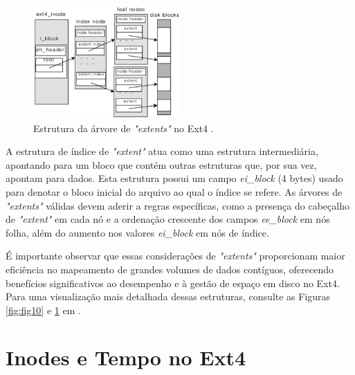 \documentclass[
	12pt,				%
	openright,			%
	oneside,			%
	a4paper,			%
	chapter=TITLE,		%
	english,			%
	french,				%
	spanish,			%
	brazil				%
	]{abntex2}
\theoremstyle{definition}
\begin{document}
\begin{figure}[H]
    \centering
    \includegraphics[width=0.5\textwidth]{fig11.jpg}
    \caption{Estrutura da árvore de \textit{"extents"} no Ext4 \cite{matur}.}
    \label{fig:fig11}
\end{figure}

A estrutura de índice 
de \textit{"extent"} atua como uma estrutura intermediária, apontando para um bloco que 
contém outras estruturas que, por sua vez, apontam para dados. Esta estrutura possui um campo
\textit{ei\_block} (4 bytes) usado para denotar o bloco inicial do arquivo ao qual o índice se 
refere. As árvores de \textit{"extents"} válidas devem aderir a regras específicas, 
como a presença do cabeçalho de \textit{"extent"} em cada nó e a ordenação crescente dos 
campos \textit{ee\_block} em nós folha, além do aumento nos valores \textit{ei\_block} em nós de índice.

É importante observar que essas considerações de \textit{"extents"} proporcionam maior eficiência 
no mapeamento de grandes volumes de dados contíguos, oferecendo benefícios significativos ao 
desempenho e à gestão de espaço em disco no Ext4. Para uma visualização mais detalhada dessas 
estruturas, consulte as Figuras \ref{fig:fig10} e \ref{fig:fig11} em \cite{matur}.

\section{Inodes e Tempo no Ext4}
\end{document}
